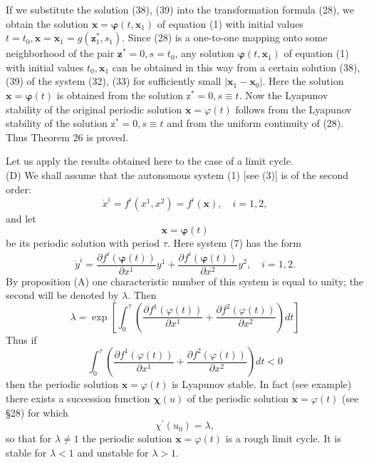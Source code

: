 \documentclass[10pt,a5paper]{book}
\makeatletter
\theoremstyle{plain}
\theoremstyle{definition}
\theoremstyle{remark}
\renewenvironment{proof}[1][\proofname]{\par
  \pushQED{\qed}%
  \normalfont\topsep6\p@\@plus6\p@\relax
  \trivlist
  \item\relax{\itshape #1\@addpunct{.}}\hspace\labelsep\ignorespaces
}{\popQED\endtrivlist\@endpefalse}
\makeatother
\begin{document}
\begin{proof}[Proof of Theorem 26]
If we substitute the solution (38), (39) into the transformation formula (28), we obtain the solution $\mathbf{x}=\boldsymbol{\varphi}\left(t, \mathbf{x}_{1}\right)$ of equation (1) with initial values $t=t_{0}, \mathbf{x}=\mathbf{x}_{1}=g\left(\mathbf{z}_{1}^{*}, s_{1}\right)$. Since (28) is a one-to-one mapping onto some neighborhood of the pair $\mathbf{z}^{*}=0, s=t_{0}$, any solution $\boldsymbol{\varphi}\left(t, \mathbf{x}_{1}\right)$ of equation (1) with initial values $t_{0}, \mathbf{x}_{1}$ can be obtained in this way from a certain solution (38), (39) of the system (32), (33) for sufficiently small $\left|\mathbf{x}_{1}-\mathbf{x}_{0}\right|$. Here the solution $\mathbf{x}=\boldsymbol{\varphi}(t)$ is obtained from the solution $\mathrm{z}^{*}=0, s \equiv t$. Now the Lyapunov stability of the original periodic solution $\mathbf{x}=\varphi(t)$ follows from the Lyapunov stability of the solution $\mathrm{z}^{*}=0, s \equiv t$ and from the uniform continuity of (28). Thus Theorem 26 is proved.

Let us apply the results obtained here to the case of a limit cycle.\\[0pt]
(D) We shall assume that the autonomous system (1) [see (3)] is of the second order:
\[
\dot{x}^{i}=f^{i}\left(x^{1}, x^{2}\right)=f^{i}(\mathbf{x}), \quad i=1,2,
\]
and let
\[
\mathbf{x}=\boldsymbol{\varphi}(t)
\]
be its periodic solution with period $\tau$. Here system (7) has the form
\[
\dot{y}^{i}=\frac{\partial f^{i}(\boldsymbol{\varphi}(t))}{\partial x^{1}} y^{1}+\frac{\partial f^{i}(\boldsymbol{\varphi}(t))}{\partial x^{2}} y^{2}, \quad i=1,2 .
\]
By proposition (A) one characteristic number of this system is equal to unity; the second will be denoted by $\lambda$. Then
\begin{equation*}
\lambda=\exp \left[\int_{0}^{\tau}\left(\frac{\partial f^{1}(\varphi(t))}{\partial x^{1}}+\frac{\partial f^{2}(\varphi(t))}{\partial x^{2}}\right) d t\right] \tag{41}
\end{equation*}
Thus if
\[
\int_{0}^{\tau}\left(\frac{\partial f^{1}(\varphi(t))}{\partial x^{1}}+\frac{\partial f^{2}(\varphi(t))}{\partial x^{2}}\right) d t<0
\]
then the periodic solution $\mathbf{x}=\varphi(t)$ is Lyapunov stable. In fact (see example) there exists a succession function $\boldsymbol{\chi}(u)$ of the periodic solution $\mathbf{x}=\varphi(t)$ (see §28) for which
\begin{equation*}
\chi^{\prime}\left(u_{0}\right)=\lambda, \tag{42}
\end{equation*}
so that for $\lambda \neq 1$ the periodic solution $\mathbf{x}=\varphi(t)$ is a rough limit cycle. It is stable for $\lambda<1$ and unstable for $\lambda>1$.


\end{proof}
\end{document}
